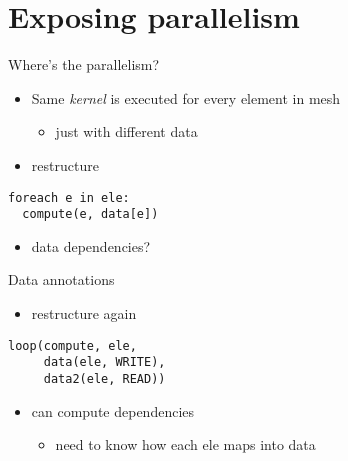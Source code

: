 \documentclass[bigger]{beamer}
\begin{document}
\section{Exposing parallelism}
\label{sec:orgheadline7}
\begin{frame}[fragile,label={sec:orgheadline5}]{Where's the parallelism?}
 \begin{itemize}
\item Same \emph{kernel} is executed for every element in mesh
\begin{itemize}
\item just with different data
\end{itemize}

\item restructure
\end{itemize}
\begin{verbatim}
foreach e in ele:
  compute(e, data[e])
\end{verbatim}

\begin{itemize}
\item data dependencies?
\end{itemize}
\end{frame}

\begin{frame}[fragile,label={sec:orgheadline6}]{Data annotations}
 \begin{itemize}
\item restructure again
\end{itemize}
\begin{verbatim}
loop(compute, ele,
     data(ele, WRITE),
     data2(ele, READ))
\end{verbatim}
\begin{itemize}
\item can compute dependencies
\begin{itemize}
\item need to know how each ele maps into data
\end{itemize}
\end{itemize}
\end{frame}
\end{document}
